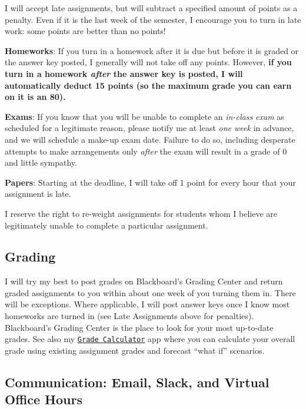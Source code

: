 \documentclass{article}
\begin{document}
I will accept late assignments, but will subtract a specified amount of
points as a penalty. Even if it is the last week of the semester, I
encourage you to turn in late work: some points are better than no
points!

\textbf{Homeworks}: If you turn in a homework after it is due but before
it is graded or the answer key posted, I generally will not take off any
points. However, \textbf{if you turn in a homework \emph{after} the
answer key is posted, I will automatically deduct 15 points (so the
maximum grade you can earn on it is an 80).}

\textbf{Exams}: If you know that you will be unable to complete an
\emph{in-class exam} as scheduled for a legitimate reason, please notify
me at least \emph{one week} in advance, and we will schedule a make-up
exam date. Failure to do so, including desperate attempts to make
arrangements only \emph{after} the exam will result in a grade of 0 and
little sympathy.

\textbf{Papers}: Starting at the deadline, I will take off 1 point for
every hour that your assignment is late.

I reserve the right to re-weight assignments for students whom I believe
are legitimately unable to complete a particular assignment.

\hypertarget{grading}{%
\subsection{Grading}\label{grading}}

I will try my best to post grades on Blackboard's Grading Center and
return graded assignments to you within about one week of you turning
them in. There will be exceptions. Where applicable, I will post answer
keys once I know most homeworks are turned in (see Late Assignments
above for penalties). Blackboard's Grading Center is the place to look
for your most up-to-date grades. See also my
\href{https://ryansafner.shinyapps.io/game_grade_calculator/}{
\texttt{Grade\ Calculator}} app where you can calculate your overall
grade using existing assignment grades and forecast ``what if''
scenarios.

\hypertarget{communication-email-slack-and-virtual-office-hours}{%
\subsection{Communication: Email, Slack, and Virtual Office
Hours}\label{communication-email-slack-and-virtual-office-hours}}
\end{document}
